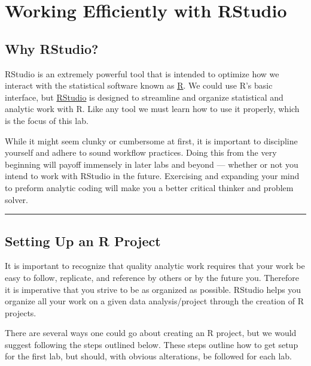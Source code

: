 \documentclass[]{book}
\theoremstyle{definition}
\theoremstyle{definition}
\theoremstyle{definition}
\theoremstyle{remark}
\begin{document}
\hypertarget{working-efficiently-with-rstudio}{%
\chapter{Working Efficiently with
RStudio}\label{working-efficiently-with-rstudio}}

\hypertarget{why-rstudio}{%
\section{Why RStudio?}\label{why-rstudio}}

RStudio is an extremely powerful tool that is intended to optimize how
we interact with the statistical software known as
\href{https://www.r-project.org/about.html}{R}. We could use R's basic
interface, but \href{https://www.rstudio.com/}{RStudio} is designed to
streamline and organize statistical and analytic work with R. Like any
tool we must learn how to use it properly, which is the focus of this
lab.

While it might seem clunky or cumbersome at first, it is important to
discipline yourself and adhere to sound workflow practices. Doing this
from the very beginning will payoff immensely in later labs and beyond
--- whether or not you intend to work with RStudio in the future.
Exercising and expanding your mind to preform analytic coding will make
you a better critical thinker and problem solver.

\begin{center}\rule{0.5\linewidth}{\linethickness}\end{center}

\hypertarget{setting-up-an-r-project}{%
\section{Setting Up an R Project}\label{setting-up-an-r-project}}

It is important to recognize that quality analytic work requires that
your work be easy to follow, replicate, and reference by others or by
the future you. Therefore it is imperative that you strive to be as
organized as possible. RStudio helps you organize all your work on a
given data analysis/project through the creation of R projects.

There are several ways one could go about creating an R project, but we
would suggest following the steps outlined below. These steps outline
how to get setup for the first lab, but should, with obvious
alterations, be followed for each lab.
\end{document}
